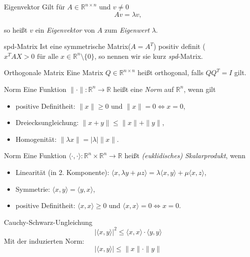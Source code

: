
\begin{flashcard}[Definition]{Eigenvektor}
Gilt für $A \in \mathbb{R}^{n \times n}$ und $v \neq 0$
$$
	A v = \lambda v,
$$

so heißt $v$ ein \emph{Eigenvektor} von $A$ zum \emph{Eigenwert} $\lambda$. 
\end{flashcard}

\begin{flashcard}[Definition]{spd-Matrix}
	Ist eine symmetrische Matrix($A = A^T$) positiv definit ($x^T A X > 0 \text{ für alle } x \in \mathbb{R}^n\setminus\{0\}$, so nennen wir sie kurz \emph{spd}-Matrix.
\end{flashcard}

\begin{flashcard}[Definition]{Orthogonale Matrix}
	Eine Matrix $Q \in \mathbb{R}^{n \times n}$ heißt orthogonal, falls $QQ^T = I$ gilt.
\end{flashcard}

\begin{flashcard}[Definition]{Norm}
	Eine Funktion $\|\cdot\| : \mathbb{R}^n \rightarrow \mathbb{R}$ heißt eine \emph{Norm} auf $\mathbb{R}^n$, wenn gilt
	\begin{itemize}
		\item positive Definitheit: $\|x\| \geq 0$ und $\|x\| = 0 \Leftrightarrow x = 0$,
		\item Dreiecksungleichung: $ \| x + y \| \leq \|x\| + \|y\|$,
		\item Homogenität: $\|\lambda x\| = |\lambda|\|x\|$.
	\end{itemize}
\end{flashcard}

\begin{flashcard}[Definition]{Norm}
	Eine Funktion $\langle \cdot, \cdot \rangle : \mathbb{R}^n \times \mathbb{R}^n \rightarrow \mathbb{R}$ heißt \emph{(euklidisches) Skalarprodukt}, wenn
	\begin{itemize}
		\item Linearität (in 2. Komponente): $\langle x, \lambda y + \mu z \rangle = \lambda \langle x, y \rangle + \mu \langle x, z \rangle$,
		\item Symmetrie: $\langle x, y\rangle = \langle y, x \rangle$,
		\item positive Definitheit: $\langle x, x \rangle \geq 0$ und $\langle x, x \rangle = 0 \Leftrightarrow x = 0$.
	\end{itemize}
\end{flashcard}

\begin{flashcard}[Satz]{Cauchy-Schwarz-Ungleichung}
	$$|\langle x, y \rangle|^2 \leq \langle x, x \rangle \cdot \langle y, y \rangle$$
	Mit der induzierten Norm:
	$$ |\langle x, y \rangle| \leq \|x\| \cdot \|y\| $$
\end{flashcard}
